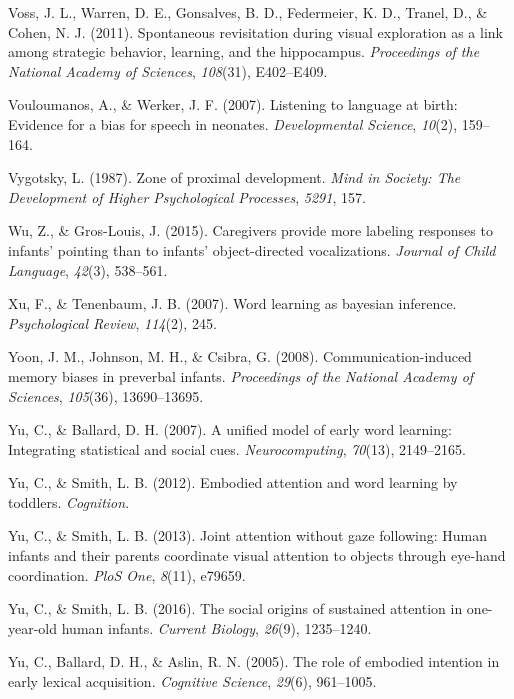 \documentclass[a4paper,man,apacite,floatsintext]{apa6}
\begin{document}
\hypertarget{ref-voss2011spontaneous}{}
Voss, J. L., Warren, D. E., Gonsalves, B. D., Federmeier, K. D., Tranel,
D., \& Cohen, N. J. (2011). Spontaneous revisitation during visual
exploration as a link among strategic behavior, learning, and the
hippocampus. \emph{Proceedings of the National Academy of Sciences},
\emph{108}(31), E402--E409.

\hypertarget{ref-vouloumanos2007listening}{}
Vouloumanos, A., \& Werker, J. F. (2007). Listening to language at
birth: Evidence for a bias for speech in neonates. \emph{Developmental
Science}, \emph{10}(2), 159--164.

\hypertarget{ref-vygotsky1987zone}{}
Vygotsky, L. (1987). Zone of proximal development. \emph{Mind in
Society: The Development of Higher Psychological Processes},
\emph{5291}, 157.

\hypertarget{ref-wu2015caregivers}{}
Wu, Z., \& Gros-Louis, J. (2015). Caregivers provide more labeling
responses to infants' pointing than to infants' object-directed
vocalizations. \emph{Journal of Child Language}, \emph{42}(3), 538--561.

\hypertarget{ref-xu2007word}{}
Xu, F., \& Tenenbaum, J. B. (2007). Word learning as bayesian inference.
\emph{Psychological Review}, \emph{114}(2), 245.

\hypertarget{ref-yoon2008communication}{}
Yoon, J. M., Johnson, M. H., \& Csibra, G. (2008). Communication-induced
memory biases in preverbal infants. \emph{Proceedings of the National
Academy of Sciences}, \emph{105}(36), 13690--13695.

\hypertarget{ref-yu2007unified}{}
Yu, C., \& Ballard, D. H. (2007). A unified model of early word
learning: Integrating statistical and social cues.
\emph{Neurocomputing}, \emph{70}(13), 2149--2165.

\hypertarget{ref-yu2012embodied}{}
Yu, C., \& Smith, L. B. (2012). Embodied attention and word learning by
toddlers. \emph{Cognition}.

\hypertarget{ref-yu2013joint}{}
Yu, C., \& Smith, L. B. (2013). Joint attention without gaze following:
Human infants and their parents coordinate visual attention to objects
through eye-hand coordination. \emph{PloS One}, \emph{8}(11), e79659.

\hypertarget{ref-yu2016social}{}
Yu, C., \& Smith, L. B. (2016). The social origins of sustained
attention in one-year-old human infants. \emph{Current Biology},
\emph{26}(9), 1235--1240.

\hypertarget{ref-yu2005role}{}
Yu, C., Ballard, D. H., \& Aslin, R. N. (2005). The role of embodied
intention in early lexical acquisition. \emph{Cognitive Science},
\emph{29}(6), 961--1005.


\end{document}
